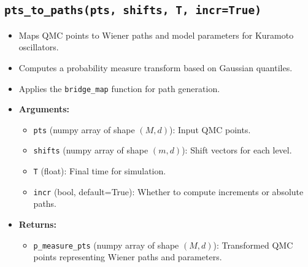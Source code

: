 \documentclass{article}
\begin{document}
\subsection{\texttt{pts\_to\_paths(pts, shifts, T, incr=True)}}
\begin{itemize}
    \item Maps QMC points to Wiener paths and model parameters for Kuramoto oscillators.
    \item Computes a probability measure transform based on Gaussian quantiles.
    \item Applies the \texttt{bridge\_map} function for path generation.
    \item \textbf{Arguments:}
    \begin{itemize}
        \item \texttt{pts} (numpy array of shape $(M, d)$): Input QMC points.
        \item \texttt{shifts} (numpy array of shape $(m, d)$): Shift vectors for each level.
        \item \texttt{T} (float): Final time for simulation.
        \item \texttt{incr} (bool, default=True): Whether to compute increments or absolute paths.
    \end{itemize}
    \item \textbf{Returns:}
    \begin{itemize}
        \item \texttt{p\_measure\_pts} (numpy array of shape $(M, d)$): Transformed QMC points representing Wiener paths and parameters.
    \end{itemize}
\end{itemize}
\end{document}
